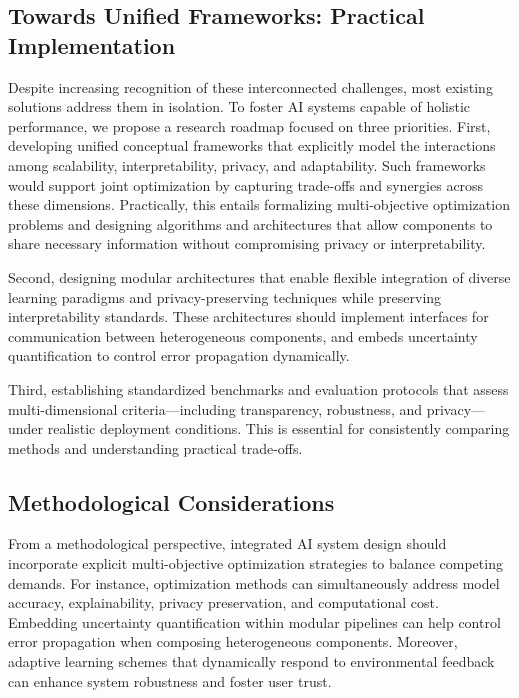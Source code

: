 \documentclass[sigconf]{acmart}
\begin{document}
\subsection{Towards Unified Frameworks: Practical Implementation}

Despite increasing recognition of these interconnected challenges, most existing solutions address them in isolation. To foster AI systems capable of holistic performance, we propose a research roadmap focused on three priorities. First, developing unified conceptual frameworks that explicitly model the interactions among scalability, interpretability, privacy, and adaptability. Such frameworks would support joint optimization by capturing trade-offs and synergies across these dimensions. Practically, this entails formalizing multi-objective optimization problems and designing algorithms and architectures that allow components to share necessary information without compromising privacy or interpretability.

Second, designing modular architectures that enable flexible integration of diverse learning paradigms and privacy-preserving techniques while preserving interpretability standards. These architectures should implement interfaces for communication between heterogeneous components, and embeds uncertainty quantification to control error propagation dynamically.

Third, establishing standardized benchmarks and evaluation protocols that assess multi-dimensional criteria—including transparency, robustness, and privacy—under realistic deployment conditions. This is essential for consistently comparing methods and understanding practical trade-offs.

\subsection{Methodological Considerations}

From a methodological perspective, integrated AI system design should incorporate explicit multi-objective optimization strategies to balance competing demands. For instance, optimization methods can simultaneously address model accuracy, explainability, privacy preservation, and computational cost. Embedding uncertainty quantification within modular pipelines can help control error propagation when composing heterogeneous components. Moreover, adaptive learning schemes that dynamically respond to environmental feedback can enhance system robustness and foster user trust.
\end{document}
